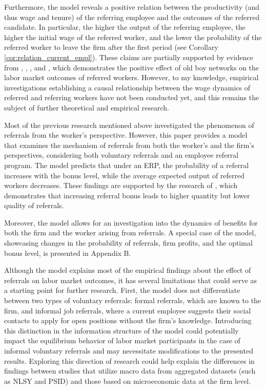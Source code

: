 \documentclass[12pt]{article}
\begin{document}
Furthermore, the model reveals a positive relation between the productivity (and thus wage and tenure) of the referring employee and the outcomes of the referred candidate. In particular, the higher the output of the referring employee, the higher the initial wage of the referred worker, and the lower the probability of the referred worker to leave the firm after the first period (see Corollary \ref{cor:relation_current_empl}). These claims are partially supported by evidence from \cite{simon1992matchmaker}, \cite{kugler2003employee}, \cite{pallais2016referential}, and \cite{levati2020impact}, which demonstrates the positive effect of old boy networks on the labor market outcomes of referred workers. However, to my knowledge, empirical investigations establishing a causal relationship between the wage dynamics of referred and referring workers have not been conducted yet, and this remains the subject of further theoretical and empirical research.

Most of the previous research mentioned above investigated the phenomenon of referrals from the worker's perspective. However, this paper provides a model that examines the mechanism of referrals from both the worker's and the firm's perspectives, considering both voluntary referrals and an employee referral program. The model predicts that under an ERP, the probability of a referral increases with the bonus level, while the average expected output of referred workers decreases. These findings are supported by the research of \cite{friebel2023employee}, which demonstrates that increasing referral bonus leads to higher quantity but lower quality of referrals.

Moreover, the model allows for an investigation into the dynamics of benefits for both the firm and the worker arising from referrals. A special case of the model, showcasing changes in the probability of referrals, firm profits, and the optimal bonus level, is presented in Appendix B.

Although the model explains most of the empirical findings about the effect of referrals on labor market outcomes, it has several limitations that could serve as a starting point for further research. First, the model does not differentiate between two types of voluntary referrals: formal referrals, which are known to the firm, and informal job referrals, where a current employee suggests their social contacts to apply for open positions without the firm's knowledge. Introducing this distinction in the information structure of the model could potentially impact the equilibrium behavior of labor market participants in the case of informal voluntary referrals and may necessitate modifications to the presented results. Exploring this direction of research could help explain the differences in findings between studies that utilize macro data from aggregated datasets (such as NLSY and PSID) and those based on microeconomic data at the firm level. 
\end{document}

